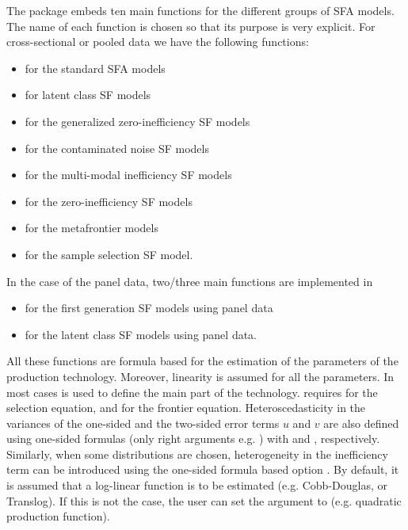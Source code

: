 \documentclass[nojss]{jss}
\begin{document}
The  package embeds ten main functions for the different groups of SFA
models. The name of each function is chosen so that its purpose is very 
explicit. For cross-sectional or pooled data we have the following functions:
%
\begin{itemize} \itemsep 10pt
\item {} for the standard SFA models 
\item {} for latent class SF models
\item {} for the generalized zero-inefficiency SF models
\item {} for the contaminated noise SF models
\item {} for the multi-modal inefficiency SF models
\item {} for the zero-inefficiency SF models
\item {} for the metafrontier models
\item {} for the sample selection SF model.
\end{itemize}
%
In the case of the panel data, two/three main functions are implemented in  
%
\begin{itemize} \itemsep 10pt
\item {} for the first generation SF models using panel data
\item {} for the latent class SF models using panel data.
\end{itemize}
%
All these functions are formula based for the estimation of the parameters of the 
production technology. Moreover, linearity is assumed for all the parameters.
In most cases  is used to define the main part of the technology. 
 requires  for the selection
equation, and  for the frontier equation. Heteroscedasticity in 
the variances of the one-sided and the two-sided error terms $u$ and $v$ are 
also defined using one-sided formulas (only right arguments e.g. ) 
with  and , respectively. Similarly, when some 
distributions are chosen, heterogeneity in the inefficiency term can be 
introduced using the one-sided formula based option . By default, 
it is assumed that a log-linear function is to be estimated (e.g. Cobb-Douglas, 
or Translog). If this is not the case, the user can set the argument 
 to  (e.g. quadratic production function).
\end{document}
